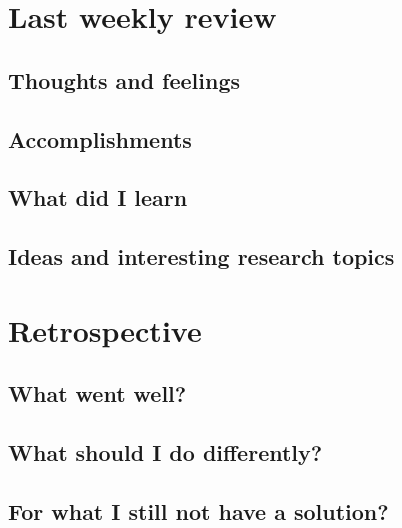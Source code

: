 
\section*{\textbf{Last weekly review}}
\subsection*{Thoughts and feelings}
\subsection*{Accomplishments}
\subsection*{What did I learn}
\subsection*{Ideas and interesting research topics}

\section*{\textbf{Retrospective}}

\subsection*{What went well?}
\subsection*{What should I do differently?}
\subsection*{For what I still not have a solution?}

